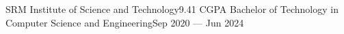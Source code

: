 \hTable
{SRM Institute of Science and Technology}{9.41 CGPA}
{Bachelor of Technology in Computer Science and Engineering}{Sep 2020 --- Jun 2024}
